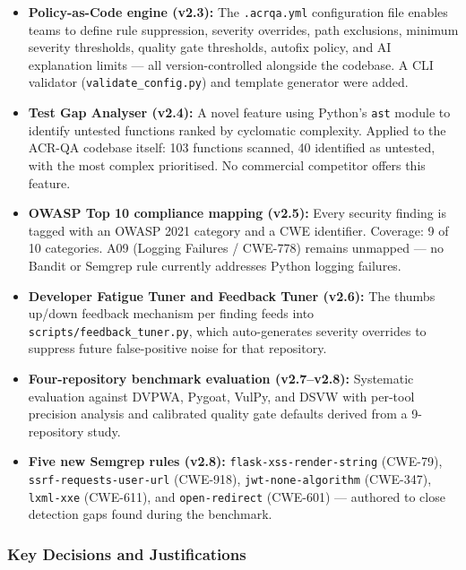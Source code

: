 \documentclass[12pt,a4paper]{article}
\begin{document}
\begin{itemize}[leftmargin=1.5em,itemsep=3pt]
  \item \textbf{Policy-as-Code engine (v2.3):} The \texttt{.acrqa.yml} configuration
  file enables teams to define rule suppression, severity overrides, path exclusions,
  minimum severity thresholds, quality gate thresholds, autofix policy, and AI
  explanation limits --- all version-controlled alongside the codebase.  A CLI
  validator (\texttt{validate\_config.py}) and template generator were added.

  \item \textbf{Test Gap Analyser (v2.4):} A novel feature using Python's
  \texttt{ast} module to identify untested functions ranked by cyclomatic complexity.
  Applied to the ACR-QA codebase itself: 103 functions scanned, 40 identified as
  untested, with the most complex prioritised.  No commercial competitor offers this
  feature.

  \item \textbf{OWASP Top 10 compliance mapping (v2.5):} Every security finding is
  tagged with an OWASP 2021 category and a CWE identifier.  Coverage: 9 of 10
  categories.  A09 (Logging Failures / CWE-778) remains unmapped --- no Bandit or
  Semgrep rule currently addresses Python logging failures.

  \item \textbf{Developer Fatigue Tuner and Feedback Tuner (v2.6):} The thumbs
  up/down feedback mechanism per finding feeds into
  \texttt{scripts/feedback\_tuner.py}, which auto-generates severity overrides to
  suppress future false-positive noise for that repository.

  \item \textbf{Four-repository benchmark evaluation (v2.7--v2.8):} Systematic
  evaluation against DVPWA, Pygoat, VulPy, and DSVW with per-tool precision
  analysis and calibrated quality gate defaults derived from a 9-repository study.

  \item \textbf{Five new Semgrep rules (v2.8):} \texttt{flask-xss-render-string}
  (CWE-79), \texttt{ssrf-requests-user-url} (CWE-918),
  \texttt{jwt-none-algorithm} (CWE-347), \texttt{lxml-xxe} (CWE-611), and
  \texttt{open-redirect} (CWE-601) --- authored to close detection gaps found during
  the benchmark.
\end{itemize}

\subsubsection{Key Decisions and Justifications}
\end{document}
